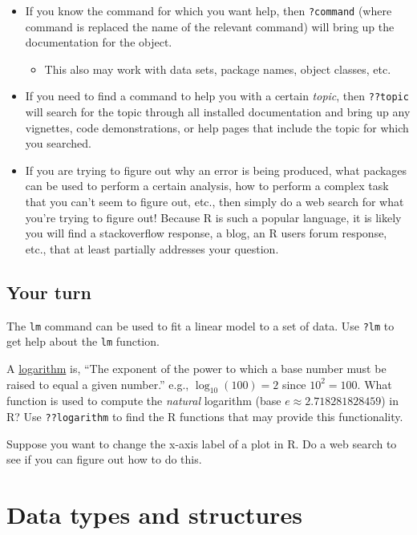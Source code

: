 \documentclass[
]{article}
\providecommand{\tightlist}{%
  \setlength{\itemsep}{0pt}\setlength{\parskip}{0pt}}
\begin{document}
\begin{itemize}
\tightlist
\item
  If you know the command for which you want help, then
  \texttt{?command} (where command is replaced the name of the relevant
  command) will bring up the documentation for the object.

  \begin{itemize}
  \tightlist
  \item
    This also may work with data sets, package names, object classes,
    etc.
  \end{itemize}
\item
  If you need to find a command to help you with a certain \emph{topic},
  then \texttt{??topic} will search for the topic through all installed
  documentation and bring up any vignettes, code demonstrations, or help
  pages that include the topic for which you searched.
\item
  If you are trying to figure out why an error is being produced, what
  packages can be used to perform a certain analysis, how to perform a
  complex task that you can't seem to figure out, etc., then simply do a
  web search for what you're trying to figure out! Because R is such a
  popular language, it is likely you will find a stackoverflow response,
  a blog, an R users forum response, etc., that at least partially
  addresses your question.
\end{itemize}

\hypertarget{your-turn-5}{%
\subsection{Your turn}\label{your-turn-5}}

The \texttt{lm} command can be used to fit a linear model to a set of
data. Use \texttt{?lm} to get help about the \texttt{lm} function.

A \href{https://www.dictionary.com/browse/logarithm?s=t}{logarithm} is,
``The exponent of the power to which a base number must be raised to
equal a given number.'' e.g., \(\log_{10}(100)=2\) since \(10^2=100\).
What function is used to compute the \emph{natural} logarithm (base
\(e\approx 2.718281828459\)) in R? Use \texttt{??logarithm} to find the
R functions that may provide this functionality.

Suppose you want to change the x-axis label of a plot in R. Do a web
search to see if you can figure out how to do this.

\hypertarget{data-types-and-structures}{%
\section{Data types and structures}\label{data-types-and-structures}}
\end{document}
